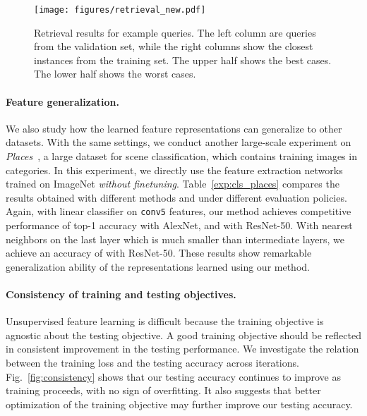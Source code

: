 \begin{figure*}[t]
	\centering
	\texttt{[image: figures/retrieval\_new.pdf]}
	\caption{\small
		Retrieval results for example queries.
		The left column are queries from the validation set, while
		the right columns show the  closest instances from the training set.
		The upper half shows the best cases. The lower half shows the worst cases.
	}
	\label{fig:retrieval}
\vspace{-3pt}
\end{figure*}

\vspace{-18pt}
\paragraph{Feature generalization.}
We also study how the learned feature representations can
generalize to other datasets. With the same settings, we conduct another
large-scale experiment on \emph{Places}~\cite{zhou2014learning}, a large
dataset for scene classification, which contains  training images
in  categories.
In this experiment, we directly use the feature extraction networks trained
on ImageNet \emph{without finetuning}. Table~\ref{exp:cls_places} compares
the results obtained with different methods and under different evaluation policies. Again, with linear classifier on \texttt{conv5} features,
our method achieves competitive performance of
top-1 accuracy  with AlexNet, and 
  with ResNet-50.
With nearest neighbors on the last layer which is much smaller than intermediate layers, we achieve an accuracy of  with ResNet-50. These results show
remarkable generalization ability of the representations learned using our method.

\vspace{-9pt}
\paragraph{Consistency of training and testing objectives.}
Unsupervised feature learning is difficult because the training objective is agnostic about the testing objective. 
A good training objective should be reflected in consistent improvement in the 
testing performance.  We investigate the relation between the training loss
and the testing accuracy across iterations.
Fig.~\ref{fig:consistency} shows that our testing accuracy continues to improve 
as training proceeds, with no sign of overfitting.
It also suggests that better optimization of the training objective
may further improve our testing accuracy.

